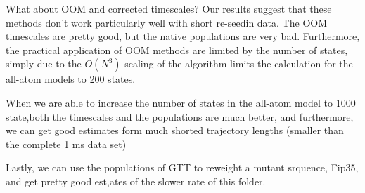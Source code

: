 \documentclass[%
 aip,
rsi,%
 amsmath,amssymb,
 reprint,%
]{revtex4-1}
\begin{document}
What about OOM and corrected timescales?  Our results suggest that these methods don't work particularly well with short re-seedin data.   The OOM timescales are pretty good, but the native populations are very bad.  Furthermore, the practical application of OOM methods are limited by the number of states, simply due to the $O(N^3)$  scaling of the algorithm limits the calculation for the all-atom models to 200 states.

When we are able to increase the number of states in the all-atom model to 1000 state,both the timescales and the populations are much better, and furthermore, we can get good estimates form much shorted trajectory lengths (smaller than the complete 1 ms data set)

Lastly, we can use the populations of GTT to reweight a mutant srquence, Fip35, and get pretty good est,ates of the slower rate of this folder.

\end{document}

